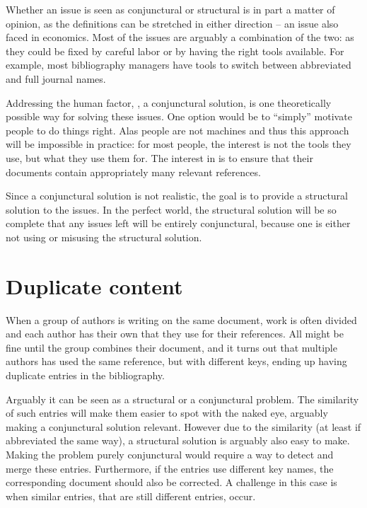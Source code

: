 Whether an issue is seen as conjunctural or structural is in part a
matter of opinion, as the definitions can be stretched in either
direction -- an issue also faced in economics.  Most of the issues are
arguably a combination of the two: as they could be fixed by careful
labor or by having the right tools available.  For example, most
bibliography managers have tools to switch between abbreviated and
full journal names.

Addressing the human factor, \ie, a conjunctural solution, is one
theoretically possible way for solving these issues.  One option would
be to ``simply'' motivate people to do things right.  Alas people are
not machines and thus this approach will be impossible in practice:
for most people, the interest is not the tools they use, but what they
use them for.  The interest in {\bibtex} is to ensure that their
documents contain appropriately many relevant references.

Since a conjunctural solution is not realistic, the goal is to provide
a structural solution to the issues.  In the perfect world, the
structural solution will be so complete that any issues left will be
entirely conjunctural, because one is either not using or misusing the
structural solution.


\section{Duplicate content}
\label{sec:problems_duplicates}

When a group of authors is writing on the same document, work is often
divided and each author has their own  that they use for
their references.  All might be fine until the group combines their
document, and it turns out that multiple authors has used the same
reference, but with different keys, ending up having duplicate entries
in the bibliography.

Arguably it can be seen as a structural or a conjunctural problem.
The similarity of such entries will make them easier to spot with the
naked eye, arguably making a conjunctural solution relevant.  However
due to the similarity (at least if abbreviated the same way), a
structural solution is arguably also easy to make.  Making the problem
purely conjunctural would require a way to detect and merge these
entries.  Furthermore, if the entries use different key names, the
corresponding document should also be corrected. A challenge in this
case is when similar entries, that are still different entries, occur.

